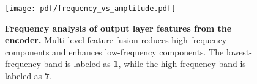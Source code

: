 \begin{figure}[t!]
\centering
\texttt{[image: pdf/frequency\_vs\_amplitude.pdf]}
\caption{\textbf{Frequency analysis of output layer features from the encoder.} Multi-level feature fusion reduces high-frequency components and enhances low-frequency components. The lowest-frequency band is labeled as \textbf{1}, while the high-frequency band is labeled as \textbf{7}.}
\label{fig:last_layer_freq}
\end{figure}
